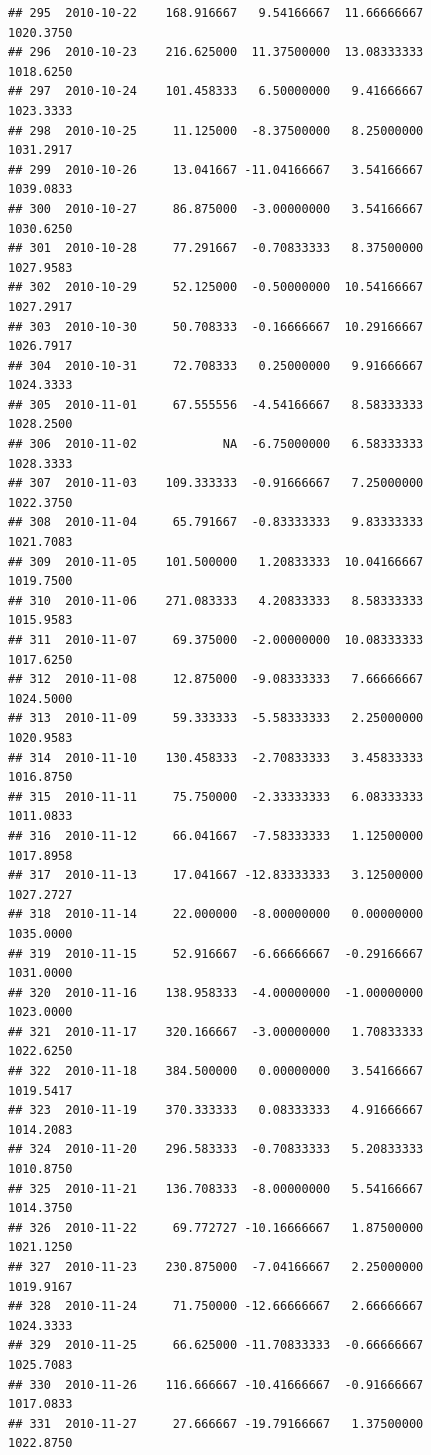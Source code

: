 \documentclass[
]{article}
\begin{document}
\begin{verbatim}
## 295  2010-10-22    168.916667   9.54166667  11.66666667    1020.3750
## 296  2010-10-23    216.625000  11.37500000  13.08333333    1018.6250
## 297  2010-10-24    101.458333   6.50000000   9.41666667    1023.3333
## 298  2010-10-25     11.125000  -8.37500000   8.25000000    1031.2917
## 299  2010-10-26     13.041667 -11.04166667   3.54166667    1039.0833
## 300  2010-10-27     86.875000  -3.00000000   3.54166667    1030.6250
## 301  2010-10-28     77.291667  -0.70833333   8.37500000    1027.9583
## 302  2010-10-29     52.125000  -0.50000000  10.54166667    1027.2917
## 303  2010-10-30     50.708333  -0.16666667  10.29166667    1026.7917
## 304  2010-10-31     72.708333   0.25000000   9.91666667    1024.3333
## 305  2010-11-01     67.555556  -4.54166667   8.58333333    1028.2500
## 306  2010-11-02            NA  -6.75000000   6.58333333    1028.3333
## 307  2010-11-03    109.333333  -0.91666667   7.25000000    1022.3750
## 308  2010-11-04     65.791667  -0.83333333   9.83333333    1021.7083
## 309  2010-11-05    101.500000   1.20833333  10.04166667    1019.7500
## 310  2010-11-06    271.083333   4.20833333   8.58333333    1015.9583
## 311  2010-11-07     69.375000  -2.00000000  10.08333333    1017.6250
## 312  2010-11-08     12.875000  -9.08333333   7.66666667    1024.5000
## 313  2010-11-09     59.333333  -5.58333333   2.25000000    1020.9583
## 314  2010-11-10    130.458333  -2.70833333   3.45833333    1016.8750
## 315  2010-11-11     75.750000  -2.33333333   6.08333333    1011.0833
## 316  2010-11-12     66.041667  -7.58333333   1.12500000    1017.8958
## 317  2010-11-13     17.041667 -12.83333333   3.12500000    1027.2727
## 318  2010-11-14     22.000000  -8.00000000   0.00000000    1035.0000
## 319  2010-11-15     52.916667  -6.66666667  -0.29166667    1031.0000
## 320  2010-11-16    138.958333  -4.00000000  -1.00000000    1023.0000
## 321  2010-11-17    320.166667  -3.00000000   1.70833333    1022.6250
## 322  2010-11-18    384.500000   0.00000000   3.54166667    1019.5417
## 323  2010-11-19    370.333333   0.08333333   4.91666667    1014.2083
## 324  2010-11-20    296.583333  -0.70833333   5.20833333    1010.8750
## 325  2010-11-21    136.708333  -8.00000000   5.54166667    1014.3750
## 326  2010-11-22     69.772727 -10.16666667   1.87500000    1021.1250
## 327  2010-11-23    230.875000  -7.04166667   2.25000000    1019.9167
## 328  2010-11-24     71.750000 -12.66666667   2.66666667    1024.3333
## 329  2010-11-25     66.625000 -11.70833333  -0.66666667    1025.7083
## 330  2010-11-26    116.666667 -10.41666667  -0.91666667    1017.0833
## 331  2010-11-27     27.666667 -19.79166667   1.37500000    1022.8750

\end{verbatim}
\end{document}
